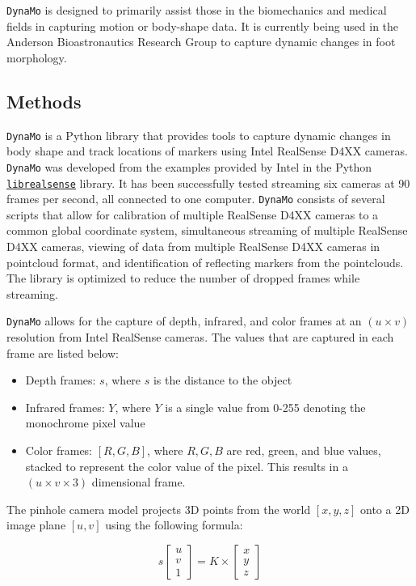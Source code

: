 \documentclass[defaultstyle,11pt]{comps}
\providecommand{\tightlist}{%
  \setlength{\itemsep}{0pt}\setlength{\parskip}{0pt}}
\begin{document}
\texttt{DynaMo} is designed to primarily assist those in the biomechanics and medical fields in capturing motion or body-shape data.
It is currently being used in the Anderson Bioastronautics Research Group to capture dynamic changes in foot morphology.

\hypertarget{methods-1}{%
\subsection{Methods}\label{methods-1}}

\texttt{DynaMo} is a Python library that provides tools to capture dynamic changes in body shape and track locations of markers using Intel RealSense D4XX cameras.
\texttt{DynaMo} was developed from the examples provided by Intel in the Python \href{https://github.com/IntelRealSense/librealsense}{\texttt{librealsense}} library. It has been successfully tested streaming six cameras at 90 frames per second, all connected to one computer.
\texttt{DynaMo} consists of several scripts that allow for calibration of multiple RealSense D4XX cameras to a common global coordinate system, simultaneous streaming of multiple RealSense D4XX cameras, viewing of data from multiple RealSense D4XX cameras in pointcloud format, and identification of reflecting markers from the pointclouds.
The library is optimized to reduce the number of dropped frames while streaming.

\texttt{DynaMo} allows for the capture of depth, infrared, and color frames at an \((u \times v)\) resolution from Intel RealSense cameras.
The values that are captured in each frame are listed below:

\begin{itemize}
\tightlist
\item
  Depth frames: \(s\), where \(s\) is the distance to the object
\item
  Infrared frames: \(Y\), where \(Y\) is a single value from 0-255 denoting the monochrome pixel value
\item
  Color frames: \([R,G,B]\), where \(R,G,B\) are red, green, and blue values, stacked to represent the color value of the pixel. This results in a \((u\times v \times 3)\) dimensional frame.
\end{itemize}

The pinhole camera model \citep{Sturm2014} projects 3D points from the world \([x,y,z]\) onto a 2D image plane \([u,v]\) using the following formula:

\begin{equation}{
s\begin{bmatrix}u\\v\\1\end{bmatrix} = K \times \begin{bmatrix}x\\y\\z\end{bmatrix}
}\end{equation}
\end{document}
